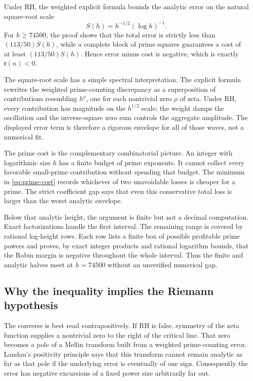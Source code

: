 \documentclass[11pt]{amsart}
\theoremstyle{definition}
\theoremstyle{remark}
\numberwithin{equation}{section}
\newcommand{\RH}{\mathrm{RH}}
\newcommand{\M}{\mathfrak r}
\begin{document}
Under $\RH$, the weighted explicit formula bounds the analytic error on the
natural square-root scale
\[
 S(h)=h^{-1/2}(\log h)^{-1}.
\]
For $h\ge74500$, the proof shows that the total error is strictly less than
$(113/50)S(h)$, while a complete block of prime squares guarantees a cost of
at least $(113/50)S(h)$.  Hence error minus cost is negative, which is exactly
$\M(n)<0$.

The square-root scale has a simple spectral interpretation.  The explicit
formula rewrites the weighted prime-counting discrepancy as a superposition
of contributions resembling $h^\rho$, one for each nontrivial zero $\rho$ of
zeta.  Under $\RH$, every contribution has magnitude on the $h^{1/2}$ scale;
the weight damps the oscillation and the inverse-square zero sum controls the
aggregate amplitude.  The displayed error term is therefore a rigorous
envelope for all of those waves, not a numerical fit.

The prime cost is the complementary combinatorial picture.  An integer with
logarithmic size $h$ has a finite budget of prime exponents.  It cannot collect
every favorable small-prime contribution without spending that budget.  The
minimum in \eqref{eq:prime-cost} records whichever of two unavoidable losses
is cheaper for a prime.  The strict coefficient gap says that even this
conservative total loss is larger than the worst analytic envelope.

Below that analytic height, the argument is finite but not a decimal
computation.  Exact factorizations handle the first interval.  The remaining
range is covered by rational log-height rows.  Each row lists a finite box of
possible profitable prime powers and proves, by exact integer products and
rational logarithm bounds, that the Robin margin is negative throughout the
whole interval.  Thus the finite and analytic halves meet at $h=74500$
without an unverified numerical gap.

\subsection{Why the inequality implies the Riemann hypothesis}

The converse is best read contrapositively.  If $\RH$ is false, symmetry of
the zeta function supplies a nontrivial zero to the right of the critical
line.  That zero becomes a pole of a Mellin transform built from a weighted
prime-counting error.  Landau's positivity principle says that this transform
cannot remain analytic as far as that pole if the underlying error is
eventually of one sign.  Consequently the error has negative excursions of a
fixed power size arbitrarily far out.
\end{document}
